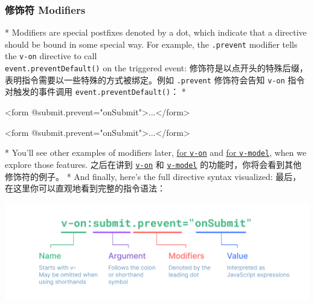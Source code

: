 \begin{paracol}{2}
\subsubsection{修饰符 Modifiers}
\switchcolumn[0]*%
Modifiers are special postfixes denoted by a dot, which indicate that a
directive should be bound in some special way. For example, the
\texttt{.prevent} modifier tells the \texttt{v-on} directive to call
\\\texttt{event.preventDefault()} on the triggered event:
\switchcolumn
修饰符是以点开头的特殊后缀，表明指令需要以一些特殊的方式被绑定。例如
\texttt{.prevent} 修饰符会告知 \texttt{v-on} 指令对触发的事件调用
\texttt{event.preventDefault()}：
\switchcolumn[0]*%
\begin{codeHtml}
<form @submit.prevent="onSubmit">...</form>
\end{codeHtml}  
\switchcolumn
\begin{codeHtml}
<form @submit.prevent="onSubmit">...</form>
\end{codeHtml}  
\switchcolumn[0]*%
You'll see other examples of modifiers later,
\href{https://vuejs.org/guide/essentials/event-handling.html\#event-modifiers}{for
\texttt{v-on}} and
\href{https://vuejs.org/guide/essentials/forms.html\#modifiers}{for
\texttt{v-model}}, when we explore those features.
\switchcolumn
之后在讲到
\href{https://cn.vuejs.org/guide/essentials/event-handling.html\#event-modifiers}{\texttt{v-on}}
和
\href{https://cn.vuejs.org/guide/essentials/forms.html\#modifiers}{\texttt{v-model}}
的功能时，你将会看到其他修饰符的例子。
\switchcolumn[0]*%
And finally, here's the full directive syntax visualized:
\switchcolumn
最后，在这里你可以直观地看到完整的指令语法：
\end{paracol}
\begin{center} 
\includegraphics{./img/directive.69c37117.png} 
\end{center}
